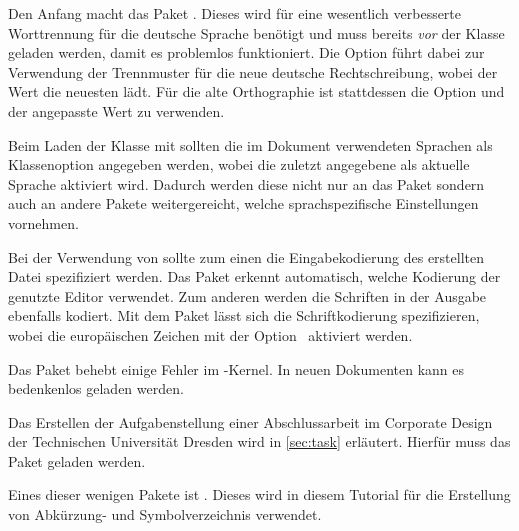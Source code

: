 \documentclass[%
  english,ngerman,%
  geometry=no,DIV=12,automark,%
]{tudscrartcl}
\begin{document}
Den Anfang macht das Paket . Dieses wird für eine wesentlich 
verbesserte Worttrennung für die deutsche Sprache benötigt und muss bereits 
\emph{vor} der Klasse geladen werden, damit es problemlos funktioniert. Die 
Option  führt dabei zur Verwendung der Trennmuster für die 
neue deutsche Rechtschreibung, wobei der Wert  die 
neuesten lädt. Für die alte Orthographie ist stattdessen die Option 
 und der angepasste Wert zu verwenden.
%
\begin{Excerpt*}
\RequirePackage[ngerman=ngerman-x-latest]{hyphsubst}
\end{Excerpt*}
%
Beim Laden der Klasse mit  sollten die im Dokument 
verwendeten Sprachen als Klassenoption angegeben werden, wobei die zuletzt 
angegebene als aktuelle Sprache aktiviert wird. Dadurch werden diese nicht nur 
an das Paket  sondern auch an andere Pakete weitergereicht, 
welche sprachspezifische Einstellungen vornehmen.
%
%
Bei der Verwendung von  sollte zum einen die Eingabekodierung 
des erstellten Datei spezifiziert werden. Das Paket  erkennt 
automatisch, welche Kodierung der genutzte Editor verwendet. Zum anderen werden 
die Schriften in der Ausgabe ebenfalls kodiert. Mit dem Paket  
lässt sich die Schriftkodierung spezifizieren, wobei die europäischen Zeichen 
mit der Option~ aktiviert werden.
%
\begin{Excerpt*}
\usepackage{selinput}
\usepackage[T1]{fontenc}
\end{Excerpt*}
%
Das Paket  behebt einige Fehler im -Kernel. 
In neuen Dokumenten kann es bedenkenlos geladen werden.
%
\begin{Excerpt*}
\usepackage{fixltx2e}
\end{Excerpt*}
%
Das Erstellen der Aufgabenstellung einer Abschlussarbeit im Corporate Design 
der Technischen Universität Dresden wird in \autoref{sec:task} erläutert. 
Hierfür muss das Paket  geladen werden.
%
\begin{Excerpt*}
\usepackage{tudscrsupervisor}
\end{Excerpt*}
%
Eines dieser wenigen Pakete ist . Dieses wird in diesem 
Tutorial für die Erstellung von Abkürzung- und Symbolverzeichnis verwendet. 
\end{document}
